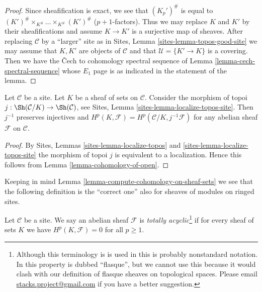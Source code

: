 \begin{proof}
Since sheafification is exact, we see that
$(K_p')^\#$ is equal to
$(K')^\# \times_{K^\#} \ldots \times_{K^\#} (K')^\#$
($p + 1$-factors). Thus we may replace $K$ and $K'$ by
their sheafifications and assume $K \to K'$ is a surjective
map of sheaves. After replacing $\mathcal{C}$ by a ``larger'' site as in
Sites, Lemma \ref{sites-lemma-topos-good-site} 
we may assume that $K, K'$ are objects of $\mathcal{C}$ and that
$\mathcal{U} = \{K' \to K\}$ is a covering. Then we have the {\v C}ech
to cohomology spectral sequence of Lemma \ref{lemma-cech-spectral-sequence}
whose $E_1$ page is as indicated in the statement of the lemma.
\end{proof}

\begin{lemma}
\label{lemma-cohomology-on-sheaf-sets}
Let $\mathcal{C}$ be a site. Let $K$ be a sheaf of sets on $\mathcal{C}$.
Consider the morphism of topoi
$j : \Sh(\mathcal{C}/K) \to \Sh(\mathcal{C})$, see
Sites, Lemma \ref{sites-lemma-localize-topos-site}.
Then $j^{-1}$ preserves injectives and
$H^p(K, \mathcal{F}) = H^p(\mathcal{C}/K, j^{-1}\mathcal{F})$
for any abelian sheaf $\mathcal{F}$ on $\mathcal{C}$.
\end{lemma}

\begin{proof}
By
Sites, Lemmas \ref{sites-lemma-localize-topos} and
\ref{sites-lemma-localize-topos-site}
the morphism of topoi $j$ is
equivalent to a localization. Hence this follows from
Lemma \ref{lemma-cohomology-of-open}.
\end{proof}

\noindent
Keeping in mind Lemma \ref{lemma-compute-cohomology-on-sheaf-sets}
we see that the following definition is the ``correct one'' also
for sheaves of modules on ringed sites.

\begin{definition}
\label{definition-limp}
Let $\mathcal{C}$ be a site.
We say an abelian sheaf $\mathcal{F}$ is
{\it totally acyclic}\footnote{Although this terminology is is used in
\cite[Vbis, Proposition 1.3.10]{SGA4} this is probably nonstandard notation.
In \cite[V, Definition 4.1]{SGA4} this property is dubbed ``flasque'', but
we cannot use this because it would clash with our definition
of flasque sheaves on topological spaces. Please email
\href{mailto:stacks.project@gmail.com}{stacks.project@gmail.com}
if you have a better suggestion.}
if for every sheaf of sets $K$ we have $H^p(K, \mathcal{F}) = 0$
for all $p \geq 1$.
\end{definition}

